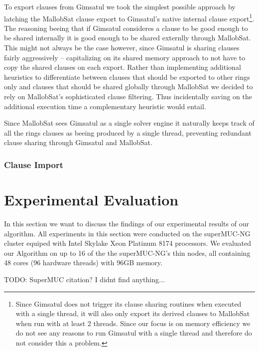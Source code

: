 \documentclass[12pt,a4paper,twoside]{scrartcl}
\numberwithin{equation}{section}
\begin{document}
To export clauses from Gimsatul we took the simplest possible approach by latching the MallobSat clause export to Gimsatul's native internal clause export\footnote{Since Gimsatul does not trigger its clause sharing routines when executed with a single thread, it will also only export its derived clauses to MallobSat when run with at least 2 threads. Since our focus is on memory efficiency we do not see any reasons to run Gimsatul with a single thread and therefore do not consider this a problem.}. The reasoning beeing that if Gimsatul consideres a clause to be good enough to be shared internally it is good enough to be shared externlly through MallobSat. This might not always be the case however, since Gimsatul is sharing clauses fairly aggressively -- capitalizing on its shared memory approach to not have to copy the shared clauses on each export. Rather than implementing additional heuristics to differentiate between clauses that should be exported to other rings only and clauses that should be shared globally through MallobSat we decided to rely on MallobSat's sophisticated clause filtering. Thus incidentally saving on the additional execution time a complementary heuristic would entail.

Since MallobSat sees Gimsatul as a single solver engine it naturally keeps track of all the rings clauses as beeing produced by a single thread, preventing redundant clause sharing through Gimsatul and MallobSat.

\subsubsection{Clause Import}




\newpage
\section{Experimental Evaluation}

In this section we want to discuss the findings of our experimental results of our algorithm. All experiments in this section were conducted on the superMUC-NG cluster equiped with Intel Skylake Xeon Platinum 8174 processors. We evaluated our Algorithm on up to 16 of the the superMUC-NG's thin nodes, all containing 48 cores (96 hardware threads) with 96GB memory.

TODO: SuperMUC citation? I didnt find anything...
\end{document}
